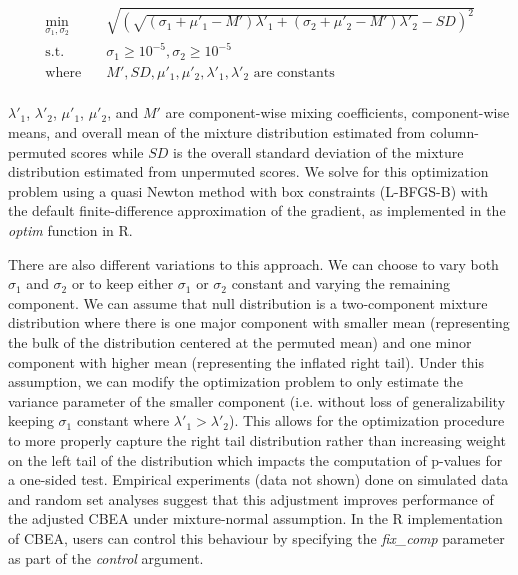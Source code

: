 \begin{equation} \label{eq:c3}
\begin{aligned}
    \min_{\sigma_1, \sigma_2} \quad & \sqrt{\left(\sqrt{(\sigma_1 + \mu'_1 - M')\lambda'_1 + (\sigma_2 + \mu'_2 - M')\lambda'_2} - SD\right)^2}\\
    \textrm{s.t.}  \quad & \sigma_1 \geq 10^{-5}, \sigma_2 \geq 10^{-5}    \\
    \textrm{where} \quad & M', SD, \mu'_1, \mu'_2, \lambda'_1, \lambda'_2 \text{ are constants} \\
\end{aligned}
\end{equation}

$\lambda'_1$, $\lambda'_2$, $\mu'_1$, $\mu'_2$, and $M'$ are component-wise mixing coefficients, component-wise means, and overall mean of the mixture distribution estimated from column-permuted scores while $SD$ is the overall standard deviation of the mixture distribution estimated from unpermuted scores. We solve for this optimization problem using a quasi Newton method with box constraints (L-BFGS-B) with the default finite-difference approximation of the gradient, as implemented in the \emph{optim} function in R. 

There are also different variations to this approach. We can choose to vary both $\sigma_1$ and $\sigma_2$ or to keep either $\sigma_1$ or $\sigma_2$ constant and varying the remaining component. We can assume that null distribution is a two-component mixture distribution where there is one major component with smaller mean (representing the bulk of the distribution centered at the permuted mean) and one minor component with higher mean (representing the inflated right tail). Under this assumption, we can modify the optimization problem to only estimate the variance parameter of the smaller component (i.e. without loss of generalizability keeping $\sigma_1$ constant where $\lambda'_1 > \lambda'_2$). This allows for the optimization procedure to more properly capture the right tail distribution rather than increasing weight on the left tail of the distribution which impacts the computation of p-values for a one-sided test. Empirical experiments (data not shown) done on simulated data and random set analyses suggest that this adjustment improves performance of the adjusted CBEA under mixture-normal assumption. In the R implementation of CBEA, users can control this behaviour by specifying the \emph{fix\_comp} parameter as part of the \emph{control} argument.  


